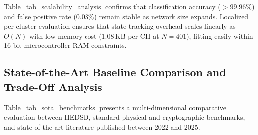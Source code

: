 \documentclass[conference]{IEEEtran}
\begin{document}
\begin{table}[htbp]
\caption{Analytical Scalability Performance Benchmark Across Network Sizes}
\label{tab_scalability_analysis}
\centering
\small
\renewcommand{\arraystretch}{1.15}
\end{table}

Table~\ref{tab_scalability_analysis} confirms that classification accuracy ($>99.96\%$) and false positive rate ($0.03\%$) remain stable as network size expands. Localized per-cluster evaluation ensures that state tracking overhead scales linearly as $O(N)$ with low memory cost ($1.08\,\text{KB}$ per CH at $N=401$), fitting easily within 16-bit microcontroller RAM constraints.

\subsection{State-of-the-Art Baseline Comparison and Trade-Off Analysis}
Table~\ref{tab_sota_benchmarks} presents a multi-dimensional comparative evaluation between HEDSD, standard physical and cryptographic benchmarks, and state-of-the-art literature published between 2022 and 2025.
\end{document}
